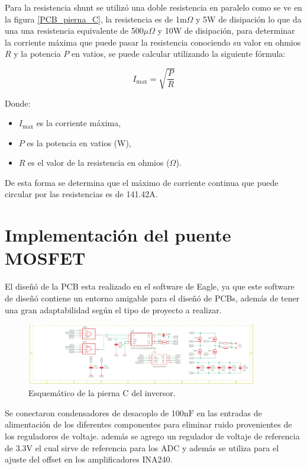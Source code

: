 \documentclass[11pt]{report}
\begin{document}
Para la resistencia shunt se utilizó una doble resistencia en paralelo como se ve en la figura \ref{PCB_pierna_C}, la resistencia es de 1m$\Omega$ y 5W de disipación lo que da una una resistencia equivalente de 500$\mu\Omega$ y 10W de disipación, para determinar la corriente máxima que puede pasar la resistencia conociendo su valor en ohmios \( R \) y la potencia \( P \) en vatios, se puede calcular utilizando la siguiente fórmula:

\[
	I_{\text{max}} = \sqrt{\frac{P}{R}}
\]

Donde:
\begin{itemize}
	\item \( I_{\text{max}} \) es la corriente máxima,
	\item \( P \) es la potencia en vatios (W),
	\item \( R \) es el valor de la resistencia en ohmios ($\Omega$).
\end{itemize}

De esta forma se determina que el máximo de corriente continua que puede circular por las resistencias es de 141.42A.

\newpage
\section{Implementación del puente MOSFET}
El diseñó de la PCB esta realizado en el software de Eagle, ya que este software de diseñó contiene un entorno amigable para el diseñó de  PCBs, además de tener una gran adaptabilidad según el tipo de proyecto a realizar.

\begin{figure}[ht]
	\centering
	\includegraphics[width=0.9\textwidth]{imagenes/Diagramas/esquematico_pierna_C.png}
	\caption{Esquemático de la pierna C del inversor.}
	\label{esquema_pierna_C}
\end{figure}
\FloatBarrier

Se conectaron condensadores de desacoplo de 100$\text{nF}$ en las entradas de alimentación de los diferentes componentes para eliminar ruido provenientes de los reguladores de voltaje. además se agrego un regulador de voltaje de referencia de 3.3V el cual sirve de referencia para los ADC y además se utiliza para el ajuste del offset en los amplificadores INA240.
\end{document}
